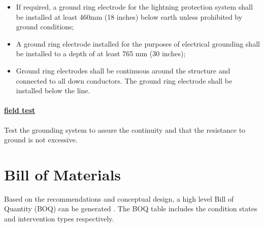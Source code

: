 \begin{itemize}
\item If required, a ground ring electrode for the lightning protection system shall be installed at least 460mm (18 inches) below earth unless prohibited by ground conditions;
\item 	A ground ring electrode installed for the purposes of electrical grounding shall be installed to a depth of at least 765 mm (30 inches);
\item 	Ground ring electrodes shall be continuous around the structure and connected to all down conductors.  The ground ring electrode shall be installed below the line.

\end{itemize}

\paragraph{\underline{field test}}
Test the grounding system to assure the continuity and that the resistance to ground is not excessive.




%
\section{Bill of Materials}
Based on the recommendations and conceptual design, a high level Bill of Quantity (BOQ) can be generated . The BOQ table includes the condition states and intervention types respectively. %


